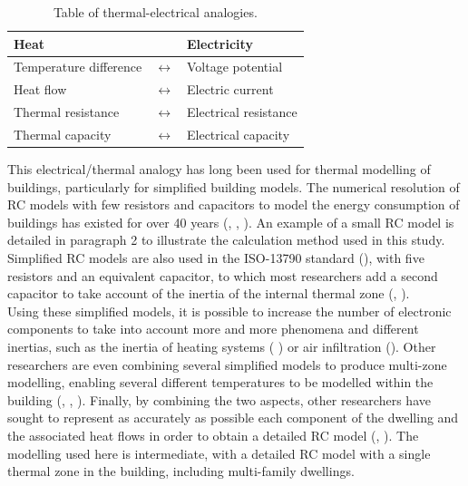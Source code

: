 \documentclass[11pt]{article}
\begin{document}
        \begin{table}[ht]
          \centering
          \caption{\label{tab:analogyrc} Table of thermal-electrical analogies.}
          \begin{tabular}{lcl}
            \toprule
            Heat & & Electricity\\
            \midrule
            Temperature difference & $\leftrightarrow$ & Voltage potential\\
            Heat flow & $\leftrightarrow$ & Electric current\\
            Thermal resistance & $\leftrightarrow$ & Electrical resistance\\
            Thermal capacity & $\leftrightarrow$ & Electrical capacity\\
            \bottomrule
          \end{tabular}
        \end{table}

        This electrical/thermal analogy has long been used for thermal modelling of buildings, particularly for simplified building models. The numerical resolution of RC models with few resistors and capacitors to model the energy consumption of buildings has existed for over 40 years (\cite{francis_methode_1982}, \cite{madsen_estimation_1995}, \cite{fraisse_development_2002}). An example of a small RC model is detailed in paragraph 2 to illustrate the calculation method used in this study. Simplified RC models are also used in the ISO-13790 standard (\cite{iso_iso_2006}), with five resistors and an equivalent capacitor, to which most researchers add a second capacitor to take account of the inertia of the internal thermal zone (\cite{parc_etude_2014}, \cite{marty-jourjon_identifiability_2022}). \\

        Using these simplified models, it is possible to increase the number of electronic components to take into account more and more phenomena and different inertias, such as the inertia of heating systems ( \cite{bacher_identifying_2011}) or air infiltration (\cite{reynders_quality_2014}). Other researchers are even combining several simplified models to produce multi-zone modelling, enabling several different temperatures to be modelled within the building (\cite{belazi_thermal_2022}, \cite{vallianos_automatic_2022}, \cite{balali_energy_2023}). Finally, by combining the two aspects, other researchers have sought to represent as accurately as possible each component of the dwelling and the associated heat flows in order to obtain a detailed RC model (\cite{wang_development_2019}, \cite{cui_model_2022}). The modelling used here is intermediate, with a detailed RC model with a single thermal zone in the building, including multi-family dwellings. \\
\end{document}

